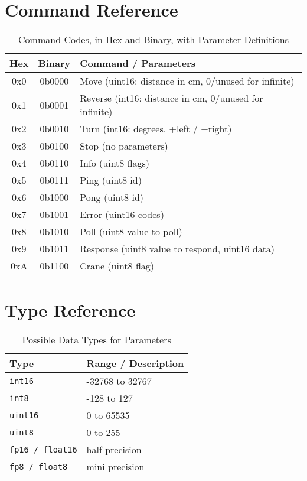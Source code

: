 \documentclass[a4paper,11pt]{article}
\begin{document}
\section{Command Reference}

\begin{table}[h!]
\centering
\begin{tabular}{>{\ttfamily}c >{\ttfamily}c l}
\toprule
\textnormal{Hex} & \textnormal{Binary} & \textnormal{Command / Parameters} \\
\midrule
0x0 & 0b0000 & Move (uint16: distance in cm, 0/unused for infinite) \\
0x1 & 0b0001 & Reverse (int16: distance in cm, 0/unused for infinite) \\
0x2 & 0b0010 & Turn (int16: degrees, +left / $-$right) \\
0x3 & 0b0100 & Stop (no parameters) \\
0x4 & 0b0110 & Info (uint8 flags) \\
0x5 & 0b0111 & Ping (uint8 id) \\
0x6 & 0b1000 & Pong (uint8 id) \\
0x7 & 0b1001 & Error (uint16 codes) \\
0x8 & 0b1010 & Poll (uint8 value to poll) \\
0x9 & 0b1011 & Response (uint8 value to respond, uint16 data) \\
0xA & 0b1100 & Crane (uint8 flag) \\

\bottomrule
\end{tabular}
\caption{Command Codes, in Hex and Binary, with Parameter Definitions}
\label{tab:commands}
\end{table}

\section{Type Reference}

\begin{table}[h!]
\centering
\begin{tabular}{l l}
\toprule
\textbf{Type} & \textbf{Range / Description} \\
\midrule
\texttt{int16} & -32768 to 32767 \\
\texttt{int8} & -128 to 127 \\
\texttt{uint16} & 0 to 65535 \\
\texttt{uint8} & 0 to 255 \\
\texttt{fp16 / float16} & half precision \\
\texttt{fp8 / float8} & mini precision \\
\bottomrule
\end{tabular}
\caption{Possible Data Types for Parameters}
\label{tab:types}
\end{table}
\end{document}
